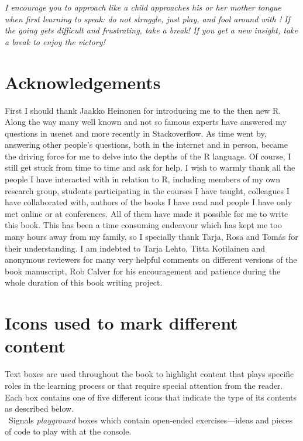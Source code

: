 \emph{I encourage you to approach \Rlang like a child approaches his or her mother tongue when first learning to speak: do not struggle, just play, and fool around with \Rlang! If the going gets difficult and frustrating, take a break! If you get a new insight, take a break to enjoy the victory!
}%

\section*{Acknowledgements}
First I should thank Jaakko Heinonen for introducing me to the then new R. Along the way many well known and not so famous experts have answered my questions in usenet and more recently in Stackoverflow. As time went by, answering other people's questions, both in the internet and in person, became the driving force for me to delve into the depths of the R language. Of course, I still get stuck from time to time and ask for help. I wish to warmly thank all the people I have interacted with in relation to R, including members of my own research group, students participating in the courses I have taught, colleagues I have collaborated with, authors of the books I have read and people I have only met online or at conferences. All of them have made it possible for me to write this book. This has been a time consuming endeavour which has kept me too many hours away from my family, so I specially thank Tarja, Rosa and Tomás for their understanding. I am indebted to Tarja Lehto, Titta Kotilainen and anonymous reviewers for many very helpful comments on different versions of the book manuscript, Rob Calver for his encouragement and patience during the whole duration of this book writing project.

\section*{Icons used to mark different content}

Text boxes are used throughout the book to highlight content that plays specific roles in the learning process or that require special attention from the reader. Each box contains one of five different icons that indicate the type of its contents as described below.\\[1.5ex]

\noindent
\playicon\ Signals \emph{playground} boxes which contain open-ended exercises---ideas and pieces of \Rlang code to play with at the \Rlang console.\\[1.5ex]

